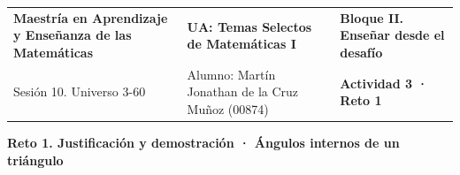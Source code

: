 \documentclass[spanish,letterpaper,landscape]{article}
\begin{document}
\color{iiiepeInk}

\noindent
\begin{tabularx}{\textwidth}{@{} >{\raggedright\arraybackslash}p{} >{\centering\arraybackslash}X >{\raggedleft\arraybackslash}p{} @{}}
\footnotesize \textbf{Maestría en Aprendizaje y Enseñanza de las Matemáticas} &
\footnotesize \textbf{UA: Temas Selectos de Matemáticas I} &
\footnotesize \textbf{Bloque II. Enseñar desde el desafío} \\
\footnotesize Sesión 10. Universo 3-60 &
\footnotesize Alumno: Martín Jonathan de la Cruz Muñoz (00874) &
\footnotesize \textbf{Actividad 3 · Reto 1}
\end{tabularx}

\vspace{4pt}
\begin{center}
  {\normalsize\bfseries Reto 1. Justificación y demostración · Ángulos internos de un triángulo}
\end{center}
\vspace{6pt}
\renewcommand{\arraystretch}{1.28}
\end{document}

